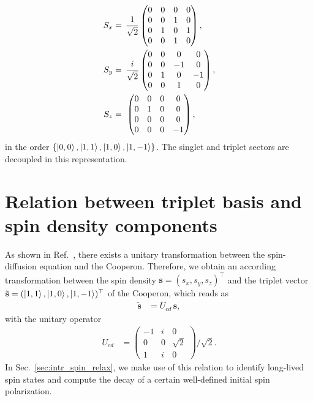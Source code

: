 \documentclass[superscriptaddress,noshowpacs,noshowkeys, twocolumn, floatfix,aps, prb,reprint]{revtex4-1}
\begin{document}
%
\begin{align}
S_x={}&
\,\frac{1}{\sqrt{2}}
\begin{pmatrix}
0&0&0&0\\
0&0&1&0\\
0&1&0&1\\
0&0&1&0
\end{pmatrix},\notag\\ 
S_y={}&
\,\frac{i}{\sqrt{2}}
\begin{pmatrix}
0&0&0&0\\
0&0&-1&0\\
0&1&0&-1\\
0&0&1&0
\end{pmatrix},\notag\\ 
S_z={}&
\,
\begin{pmatrix}
0&0&0&0\\
0&1&0&0\\
0&0&0&0\\
0&0&0&-1
\end{pmatrix},
\label{spinst}
\end{align}
%
in the order $\{\ket{0,0},\ket{1,1},\ket{1,0},\ket{1,-1}\}$. 
The singlet and triplet sectors are decoupled in this representation.


\section{Relation  between triplet basis and spin density components}\label{app:relation}

As shown in Ref.~, there exists a unitary transformation between the spin-diffusion equation and the Cooperon.
Therefore, we obtain an according transformation between the spin density $\mathbf{s}=(s_x,s_y,s_z)^\top$ and the triplet vector $\mathbf{\tilde{s}}=(\ket{1,1},\ket{1,0},\ket{1,-1})^\top$  of the Cooperon, which reads as
%
\begin{align}
\mathbf{\tilde{s}}&={}U_{cd}\,\mathbf{s},
\end{align}
%
with the unitary operator
\begin{align}
U_{cd}&={}\begin{pmatrix}
-1&i&0\\
0&0&\sqrt{2}\\
1&i&0
\end{pmatrix}/\sqrt{2}.
\end{align}
%
In Sec.~\ref{sec:intr_spin_relax}, we make use of this relation to
identify long-lived spin states and compute the decay of a certain  well-defined initial spin polarization.
\end{document}
